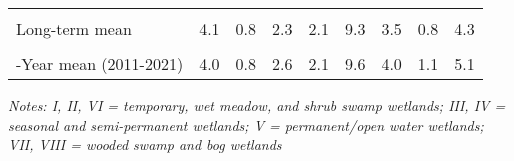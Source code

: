 \documentclass[
  12pt,
]{article}
\begin{document}
\begin{table}[!h]
{\begin{threeparttable}
\begin{tabular}[t]{>{\centering\arraybackslash}m{8em}cccccccc}
\cellcolor{gray!6}{\% Change from previous year} & \cellcolor{gray!6}{-46.0\%} & \cellcolor{gray!6}{-31.1\%} & \cellcolor{gray!6}{10.7\%} & \cellcolor{gray!6}{149.2\%} & \cellcolor{gray!6}{0.6\%} & \cellcolor{gray!6}{24.5\%} & \cellcolor{gray!6}{11.1\%} & \cellcolor{gray!6}{21.4\%}\\
Long-term mean & 4.1 & 0.8 & 2.3 & 2.1 & 9.3 & 3.5 & 0.8 & 4.3\\
\cellcolor{gray!6}{\% Change from long-term mean} & \cellcolor{gray!6}{-26.4\%} & \cellcolor{gray!6}{42.7\%} & \cellcolor{gray!6}{68.8\%} & \cellcolor{gray!6}{121.0\%} & \cellcolor{gray!6}{36.3\%} & \cellcolor{gray!6}{40.2\%} & \cellcolor{gray!6}{64.3\%} & \cellcolor{gray!6}{44.7\%}\\
10-Year mean (2011-2021) & 4.0 & 0.8 & 2.6 & 2.1 & 9.6 & 4.0 & 1.1 & 5.1\\
\bottomrule
\end{tabular}
\begin{tablenotes}
\small
\item \textit{Notes: I, II, VI = temporary, wet meadow, and shrub swamp
    wetlands; III, IV = seasonal and semi-permanent wetlands; V =
    permanent/open water wetlands; VII, VIII = wooded swamp and bog wetlands} 
\item 
\end{tablenotes}
\end{threeparttable}}
\end{table}

\newpage
\end{document}

